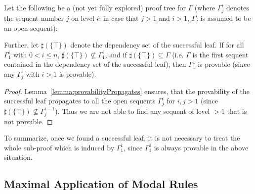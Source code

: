 \documentclass{llncs}
\begin{document}
\begin{lemma}
Let the following be a (not yet fully explored) proof tree for $\Gamma$ (where $\Gamma^i_j$ denotes
the sequent number $j$ on level $i$; in case that $j>1$ and $i>1$, $\Gamma^i_j$ is assumed to be an
open sequent):
\begin{quote}
\centerline{}
\end{quote}
Further, let $\sharp(\{\top\})$ denote the dependency set of the successful leaf. If for all $\Gamma^i_1$
with $0<i\leq n$, $\sharp(\{\top\})\not\subseteq\Gamma^i_1$,
and if $\sharp(\{\top\})\subseteq\Gamma$ (i.e. $\Gamma$ is the first sequent contained in the dependency
set of the successful leaf), then $\Gamma^1_1$ is provable (since any $\Gamma^i_j$ with $i>1$ is provable).

\begin{proof}
Lemma~\ref{lemma:provabilityPropagates} ensures, that the provability of the successful leaf
propagates to all the open sequents $\Gamma^i_j$ for $i,j>1$ (since $\sharp(\{\top\})\not\subseteq\Gamma^{i-1}_j$).
Thus we are not able to find any sequent of level $>1$ that is not provable.

\end{proof}
\end{lemma}

To summarize, once we found a successful leaf, it is not necessary to treat the whole sub-proof
which is induced by $\Gamma^1_1$, since $\Gamma^1_1$ is always provable in the above situation.

\subsection{Maximal Application of Modal Rules}
\end{document}
